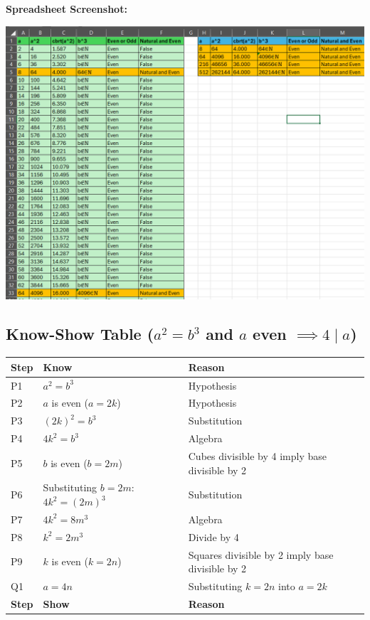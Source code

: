 \textbf{Spreadsheet Screenshot:}
\begin{center}
    \includegraphics[width=\textwidth]{s.png}

\end{center}

\newpage

\subsection{Know-Show Table (\( a^2 = b^3 \) and \( a \) even \( \implies 4 \mid a \))}

\begin{center}
    \begin{tabular}{|p{}|p{}|p{}|}
    \hline
    \textbf{Step} & \textbf{Know} & \textbf{Reason} \\
    \hline
        P1 & \( a^2 = b^3 \) & Hypothesis \\
    \hline
        P2 & \( a \) is even (\( a = 2k \)) & Hypothesis \\
    \hline
        P3 & \( (2k)^2 = b^3 \) & Substitution \\
    \hline
        P4 & \( 4k^2 = b^3 \) & Algebra \\
    \hline
        P5 & \( b \) is even (\( b = 2m \)) & Cubes divisible by 4 imply base divisible by 2 \\
    \hline
        P6 & Substituting \( b = 2m \): \( 4k^2 = (2m)^3 \) & Substitution \\
    \hline
        P7 & \( 4k^2 = 8m^3 \) & Algebra \\
    \hline
        P8 & \( k^2 = 2m^3 \) & Divide by 4 \\
    \hline
        P9 & \( k \) is even (\( k = 2n \)) & Squares divisible by 2 imply base divisible by 2 \\
    \hline
        Q1 & \( a = 4n \) & Substituting \( k = 2n \) into \( a = 2k \) \\
    \hline
    \textbf{Step} & \textbf{Show} & \textbf{Reason} \\
    \hline
    \end{tabular}
\end{center}

